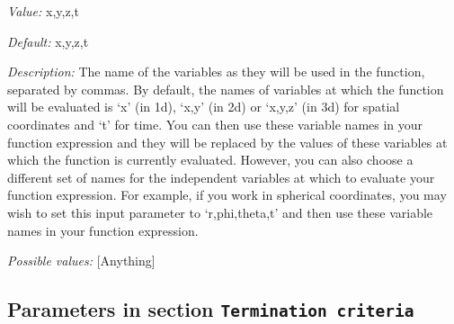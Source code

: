 \begin{itemize}
{\it Value:} x,y,z,t


{\it Default:} x,y,z,t


{\it Description:} The name of the variables as they will be used in the function, separated by commas. By default, the names of variables at which the function will be evaluated is `x' (in 1d), `x,y' (in 2d) or `x,y,z' (in 3d) for spatial coordinates and `t' for time. You can then use these variable names in your function expression and they will be replaced by the values of these variables at which the function is currently evaluated. However, you can also choose a different set of names for the independent variables at which to evaluate your function expression. For example, if you work in spherical coordinates, you may wish to set this input parameter to `r,phi,theta,t' and then use these variable names in your function expression.


{\it Possible values:} [Anything]
\end{itemize}

\subsection{Parameters in section \tt Termination criteria}
\label{parameters:Termination_20criteria}

